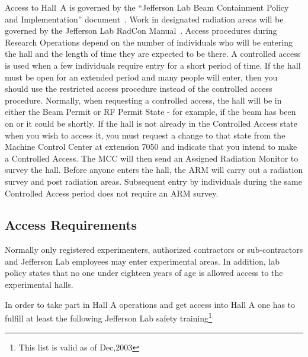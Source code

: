 Access to Hall~A is governed by the ``Jefferson Lab Beam Containment
Policy and Implementation'' document~\cite{EHScebaf6310T2}.
Work in
designated radiation areas will be governed by the Jefferson Lab
RadCon Manual~\cite{RADCONcebaf}.  Access procedures during 
Research Operations depend on
the number of individuals who will be entering the hall and the length
of time they are expected to be there.  A controlled access is used
when a few individuals require entry for a short period of time. If
the hall must be open for an extended period and many people will
enter, then you should use the restricted access procedure instead of
the controlled access procedure.  Normally, when requesting a
controlled access, the hall will be in either the Beam Permit or RF
Permit State - for example, if the beam has been on or it could be
shortly.  If the hall is not already in the Controlled Access state
when you wish to access it, you must request a change to that state
from the Machine Control Center at extension 7050 and indicate that
you intend to make a Controlled Access. The MCC will then send an
Assigned Radiation Monitor to survey the hall. Before anyone enters
the hall, the ARM will carry out a radiation survey and post radiation
areas. Subsequent entry by individuals during the same Controlled
Access period does not require an ARM survey.

\begin{safetyen}{10}{10}
\subsection{Access Requirements}
\label{sec:access-req}
\end{safetyen}

  Normally only registered experimenters, authorized contractors or
sub-contractors and Jefferson Lab employees may enter experimental
areas. 
In addition, lab policy states that no one under eighteen years
of age is allowed access to the experimental halls.

\noindent{}In order to take part in Hall A operations 
  and get access into Hall A one has to
  fulfill at least the following Jefferson Lab safety 
  training\footnote{This list is valid as of Dec,2003}%

